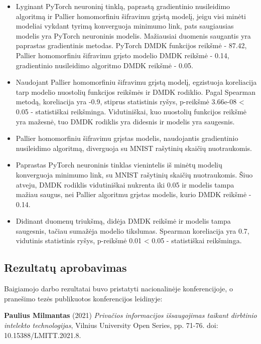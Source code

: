 \documentclass{VUMIFInfBakalaurinis}
\begin{document}
\begin{itemize}
    \item Lyginant PyTorch neuroninį tinklą, paprastą gradientinio nusileidimo algoritmą ir Pallier homomorfiniu šifravimu grįstą modelį, jeigu visi minėti modeliai vykdant tyrimą konverguoja minimumo link, pats saugiausias modelis yra PyTorch neuroninis modelis. Mažiausiai duomenis saugantis yra paprastas gradientinis metodas. PyTorch DMDK funkcijos reikšmė - 87.42, Pallier homomorfiniu šifravimu grįsto modelio DMDK reikšmė - 0.14, gradientinio nusileidimo algoritmo DMDK reikšmė - 0.05.
    \item Naudojant Pallier homomorfiniu šifravimu grįstą modelį, egzistuoja koreliacija tarp modelio nuostolių funkcijos reikšmės ir DMDK rodiklio. Pagal Spearman metodą, koreliacija yra -0.9, stiprus statistinis ryšys, p-reikšmė 3.66e-08 < 0.05 - statistiškai reikšminga. Vidutiniškai, kuo nuostolių funkcijos reikšmė yra mažesnė, tuo DMDK rodiklis yra didesnis ir modelis yra saugesnis.
    \item Pallier homomorfiniu šifravimu grįstas modelis, naudojantis gradientinio nusileidimo algoritmą, diverguoja su MNIST rašytinių skaičių nuotraukomis.
    \item Paprastas PyTorch neuroninis tinklas vienintelis iš minėtų modelių konverguoja minimumo link, su MNIST rašytinių skaičių nuotraukomis. Šiuo atveju, DMDK rodiklis vidutiniškai nukrenta iki 0.05 ir modelis tampa mažiau saugus, nei Pallier algoritmu grįstas modelis, kurio DMDK reikšmė - 0.14.
    \item Didinant duomenų triukšmą, didėja DMDK reikšmė ir modelis tampa saugesnis, tačiau sumažėja modelio tikslumas. Spearman koreliacija yra 0.7, vidutinis statistinis ryšys, p-reikšmė 0.01 < 0.05 - statistiškai reikšminga.
\end{itemize}

\subsection*{Rezultatų aprobavimas}

\par Baigiamojo darbo rezultatai buvo pristatyti nacionalinėje konferencijoje, o pranešimo tezės publikuotos konferencijos leidinyje:

\item {\bf Paulius Milmantas} (2021) {\it Privačios informacijos išsaugojimas taikant dirbtinio intelekto technologijas}, Vilnius University Open Series, pp. 71-76. doi: 10.15388/LMITT.2021.8.
\end{document}
